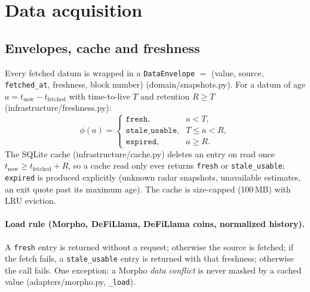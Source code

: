 \documentclass[11pt,a4paper]{article}
\newcommand{\code}[1]{\texttt{#1}}
\newcommand{\src}[1]{\textsf{\small #1}}
\begin{document}
\section{Data acquisition}

\subsection{Envelopes, cache and freshness}\label{sec:freshness}

Every fetched datum is wrapped in a \code{DataEnvelope} $=$ (value, source,
\code{fetched\_at}, freshness, block number) (\src{domain/snapshots.py}). For a
datum of age $a=t_{\text{now}}-t_{\text{fetched}}$ with time-to-live $T$ and
retention $R\geq T$ (\src{infrastructure/freshness.py}):
\begin{equation}
\phi(a)=\begin{cases}
\code{fresh}, & a<T,\\
\code{stale\_usable}, & T\leq a<R,\\
\code{expired}, & a\geq R.
\end{cases}
\end{equation}
The SQLite cache (\src{infrastructure/cache.py}) deletes an entry on read once
$t_{\text{now}}\geq t_{\text{fetched}}+R$, so a cache read only ever returns
\code{fresh} or \code{stale\_usable}; \code{expired} is produced explicitly
(unknown radar snapshots, unavailable estimates, an exit quote past its maximum
age). The cache is size-capped (100\,MB) with LRU eviction.

\paragraph{Load rule (Morpho, DeFiLlama, DeFiLlama coins, normalized history).}
A \code{fresh} entry is returned without a request; otherwise the source is
fetched; if the fetch fails, a \code{stale\_usable} entry is returned with that
freshness; otherwise the call fails. One exception: a Morpho \emph{data
conflict} is never masked by a cached value (\src{adapters/morpho.py},
\code{\_load}).
\end{document}
